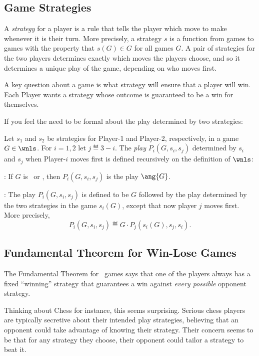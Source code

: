 \begin{definition}
\subsection{Game Strategies}

A \emph{strategy} for a player is a rule that tells the player which
move to make whenever it is their turn.  More precisely, a strategy
$s$ is a function from games to games with the property that $s(G) \in
G$ for all games $G$.  A pair of strategies for the two players
determines exactly which moves the players choose, and so it
determines a unique play of the game, depending on who moves first.

A key question about a game is what strategy will ensure that a player
will win.  Each Player wants a strategy whose outcome is guaranteed to
be a win for themselves.

\begin{staffnotes}
If you feel the need to be formal about the play determined by two
strategies:
\begin{definition*}
Let $s_1$ and $s_2$ be strategies for Player-1 and Player-2,
respectively, in a game $G \in \wnls$.  For $i=1,2$ let $j \eqdef
3-i$.  The \emph{play} $P_i(G,s_i,s_j)$ determined by $s_i$ and $s_j$
when Player-$i$ moves first is defined recursively on the definition
of $\wnls$:

: If $G$ is \winend\ or \loseend, then
$P_i(G,s_i,s_j)$ is the play $\ang{G}$.

: The play $P_i(G,s_i,s_j)$ is defined
to be $G$ followed by the play determined by the two strategies in the
game $s_i(G)$, except that now player $j$ moves first.  More
precisely,
\[
P_i(G,s_i,s_j) \eqdef G \cdot P_j(s_i(G),s_j,s_i).
\]
\end{definition*}
\end{staffnotes}

\subsection{Fundamental Theorem for Win-Lose Games}\label{FundThm_Games}

The Fundamental Theorem for \wnls\ games says that one of the players
always has a fixed ``winning'' strategy that guarantees a win against
\emph{every possible} opponent strategy.

Thinking about Chess for instance, this seems surprising.  Serious
chess players are typically secretive about their intended play
strategies, believing that an opponent could take advantage of knowing
their strategy.  Their concern seems to be that for any strategy they
choose, their opponent could tailor a strategy to beat it.


\end{definition}
